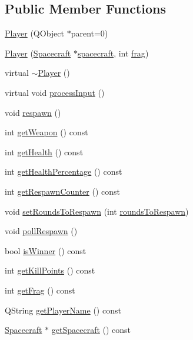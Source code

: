 \subsection*{Public Member Functions}
\begin{DoxyCompactItemize}
\item 
\hyperlink{class_player_a5c2a46dbacbc28b7cfbe352b6c0db644}{Player} (Q\+Object $\ast$parent=0)
\item 
\hyperlink{class_player_aee70fa970d83920997e0b67e29fc080d}{Player} (\hyperlink{class_spacecraft}{Spacecraft} $\ast$\hyperlink{class_player_a7cc88a054d2329b1ca7472a86b2030ca}{spacecraft}, int \hyperlink{class_player_a9528a6db252f2fe947fd7d9189837aec}{frag})
\item 
virtual \hyperlink{class_player_a749d2c00e1fe0f5c2746f7505a58c062}{$\sim$\+Player} ()
\item 
virtual void \hyperlink{class_player_ab8afa8b779cc8b9defcb232e8365d556}{process\+Input} ()
\item 
void \hyperlink{class_player_a038a74bd768b6eec8fbe57cb2bacf811}{respawn} ()
\item 
int \hyperlink{class_player_a3cef8ef0611782172327688ed90e384c}{get\+Weapon} () const 
\item 
int \hyperlink{class_player_a3042adb49808b2629137f4d85b6b5fd3}{get\+Health} () const 
\item 
int \hyperlink{class_player_a9f08c60ca4a4eae56edfc4bbadd63cef}{get\+Health\+Percentage} () const 
\item 
int \hyperlink{class_player_ae3fa0766b5a82c905b7c5e48fc5a9c8c}{get\+Respawn\+Counter} () const 
\item 
void \hyperlink{class_player_a083c1b12bc175c6226666be2c93b95ef}{set\+Rounds\+To\+Respawn} (int \hyperlink{class_player_a205c4499cffb2d684d5ff48dd1713d11}{rounds\+To\+Respawn})
\item 
void \hyperlink{class_player_a98fe6e2e7fa090a26a0afafb647e9710}{poll\+Respawn} ()
\item 
bool \hyperlink{class_player_a3827333b1bd0af0be428c6e1e03df24f}{is\+Winner} () const 
\item 
int \hyperlink{class_player_ae8e78a997352c717189cb5379fd9e70a}{get\+Kill\+Points} () const 
\item 
int \hyperlink{class_player_a706d0a53dbdf713727d67123d1b05df5}{get\+Frag} () const 
\item 
Q\+String \hyperlink{class_player_a978a40d6cca433896cc4ea63cb55b596}{get\+Player\+Name} () const 
\item 
\hyperlink{class_spacecraft}{Spacecraft} $\ast$ \hyperlink{class_player_a3e2f165ad67adec865a4a4a9bfb23463}{get\+Spacecraft} () const 
\end{DoxyCompactItemize}
